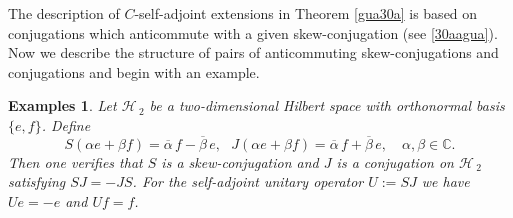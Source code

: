 \documentclass[12pt]{amsart}
\newtheorem{exms}[thm]{Examples}
\theoremstyle{definition}
\newcommand{\cH}{\mathcal{H}\,}
\newcommand{\ov}{\overline}
\begin{document}
The description of $C$-self-adjoint extensions  in Theorem \ref{gua30a} is based on conjugations which anticommute with a given skew-conjugation (see \eqref{30aagua}).  Now  we describe the structure of  pairs of anticommuting skew-conjugations and  conjugations and begin with an example.
\begin{exms}\label{exskewcon} Let $\cH_2$ be a two-dimensional Hilbert space with orthonormal basis $\{e,f\}$. Define
\begin{equation}
S(\alpha e+\beta f)=\ov{\alpha}\, f-\ov{\beta}\, e,~~~J(\alpha e+\beta f)=\ov{\alpha}\, f+\ov{\beta}\, e,\quad \alpha, \beta \in  \mathbb{C}.
\end{equation}
Then one verifies that $S$ is a skew-conjugation and $J$ is a conjugation on $\cH_2$ satisfying $SJ=-JS$. For the self-adjoint unitary operator $U:=SJ$ we have $Ue=-e$ and $Uf=f$.
\end{exms}
\end{document}
